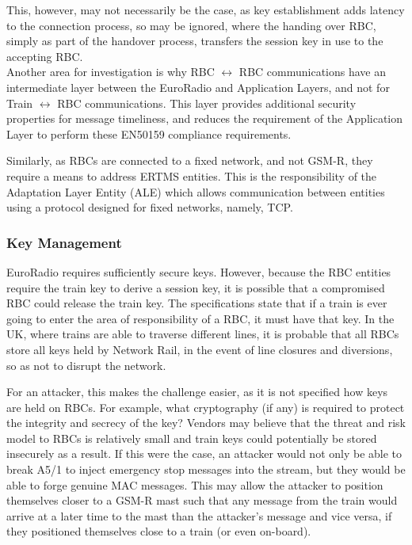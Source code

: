 \documentclass[twoside,11pt,a4paper]{article}
\begin{document}
This, however, may not necessarily be the case, as key establishment adds latency to the connection process, so may be ignored, where the handing over RBC, simply as part of the handover process, transfers the session key in use to the accepting RBC.\\
Another area for investigation is why RBC $\leftrightarrow$ RBC communications have an intermediate layer between the EuroRadio and Application Layers, and not for Train $\leftrightarrow$ RBC communications. This layer provides additional security properties for message timeliness, and reduces the requirement of the Application Layer to perform these EN50159 compliance requirements.

Similarly, as RBCs are connected to a fixed network, and not GSM-R, they require a means to address ERTMS entities. This is the responsibility of the Adaptation Layer Entity (ALE) which allows communication between entities using a protocol designed for fixed networks, namely, TCP.

\subsubsection{Key Management}
EuroRadio requires sufficiently secure keys. However, because the RBC entities require the train key to derive a session key, it is possible that a compromised RBC could release the train key. The specifications state that if a train is ever going to enter the area of responsibility of a RBC, it must have that key. In the UK, where trains are able to traverse different lines, it is probable that all RBCs store all keys held by Network Rail, in the event of line closures and diversions, so as not to disrupt the network.

For an attacker, this makes the challenge easier, as it is not specified how keys are held on RBCs. For example, what cryptography (if any) is required to protect the integrity and secrecy of the key? Vendors may believe that the threat and risk model to RBCs is relatively small and train keys could potentially be stored insecurely as a result. If this were the case, an attacker would not only be able to break A5/1 to inject emergency stop messages into the stream, but they would be able to forge genuine MAC messages. This may allow the attacker to position themselves closer to a GSM-R mast such that any message from the train would arrive at a later time to the mast than the attacker's message and vice versa, if they positioned themselves close to a train (or even on-board).
\end{document}
